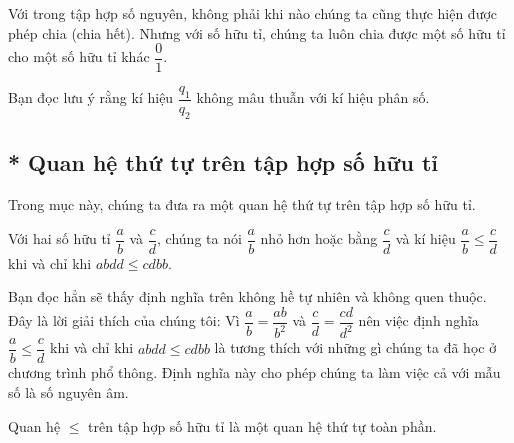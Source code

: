 Với trong tập hợp số nguyên, không phải khi nào chúng ta cũng thực hiện được phép chia (chia hết). Nhưng với số hữu tỉ, chúng ta luôn chia được một số hữu tỉ cho một số hữu tỉ khác $\dfrac{0}{1}$.

Bạn đọc lưu ý rằng kí hiệu $\dfrac{q_{1}}{q_{2}}$ không mâu thuẫn với kí hiệu phân số.

\subsection{* Quan hệ thứ tự trên tập hợp số hữu tỉ}

Trong mục này, chúng ta đưa ra một quan hệ thứ tự trên tập hợp số hữu tỉ.
\begin{definition}
    Với hai số hữu tỉ $\dfrac{a}{b}$ và $\dfrac{c}{d}$, chúng ta nói $\dfrac{a}{b}$ nhỏ hơn hoặc bằng $\dfrac{c}{d}$ và kí hiệu $\dfrac{a}{b}\leq \dfrac{c}{d}$ khi và chỉ khi $abdd \leq cdbb$.
\end{definition}

Bạn đọc hẳn sẽ thấy định nghĩa trên không hề tự nhiên và không quen thuộc. Đây là lời giải thích của chúng tôi: Vì $\dfrac{a}{b} = \dfrac{ab}{b^{2}}$ và $\dfrac{c}{d} = \dfrac{cd}{d^{2}}$ nên việc định nghĩa $\dfrac{a}{b}\leq \dfrac{c}{d}$ khi và chỉ khi $abdd \leq cdbb$ là tương thích với những gì chúng ta đã học ở chương trình phổ thông. Định nghĩa này cho phép chúng ta làm việc cả với mẫu số là số nguyên âm.

\begin{theorem}
    Quan hệ $\leq$ trên tập hợp số hữu tỉ là một quan hệ thứ tự toàn phần.
\end{theorem}

